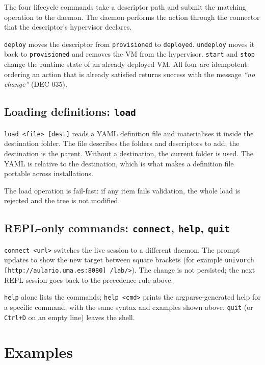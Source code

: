 The four lifecycle commands take a descriptor path and submit the
matching operation to the daemon. The daemon performs the action
through the connector that the descriptor's hypervisor declares.

\texttt{deploy} moves the descriptor from \texttt{provisioned} to
\texttt{deployed}. \texttt{undeploy} moves it back to
\texttt{provisioned} and removes the VM from the hypervisor.
\texttt{start} and \texttt{stop} change the runtime state of an
already deployed VM. All four are idempotent: ordering an action
that is already satisfied returns success with the message
\emph{``no change''} (DEC-035).

\subsection{Loading definitions: \texttt{load}}

\texttt{load <file> [dest]} reads a YAML definition file and
materialises it inside the destination folder. The file describes
the folders and descriptors to add; the destination is the parent.
Without a destination, the current folder is used. The YAML is
relative to the destination, which is what makes a definition file
portable across installations.

The load operation is fail-fast: if any item fails validation, the
whole load is rejected and the tree is not modified.

\subsection{REPL-only commands: \texttt{connect}, \texttt{help}, \texttt{quit}}

\texttt{connect <url>} switches the live session to a different
daemon. The prompt updates to show the new target between square
brackets (for example \texttt{univorch [http://aulario.uma.es:8080]
/lab/>}). The change is not persisted; the next REPL session goes
back to the precedence rule above.

\texttt{help} alone lists the commands; \texttt{help <cmd>} prints
the argparse-generated help for a specific command, with the same
syntax and examples shown above. \texttt{quit} (or \texttt{Ctrl+D}
on an empty line) leaves the shell.

\section{Examples}

